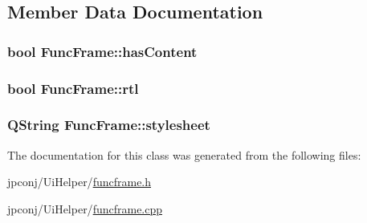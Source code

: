 \subsection{Member Data Documentation}
\subsubsection[{\texorpdfstring{has\+Content}{hasContent}}]{\setlength{\rightskip}{0pt plus 5cm}bool Func\+Frame\+::has\+Content\hspace{0.3cm}{\ttfamily [protected]}}\hypertarget{class_func_frame_a9e2ab69ca54b7f45ab9b314b5a2d94ff}{}\label{class_func_frame_a9e2ab69ca54b7f45ab9b314b5a2d94ff}
\subsubsection[{\texorpdfstring{rtl}{rtl}}]{\setlength{\rightskip}{0pt plus 5cm}bool Func\+Frame\+::rtl\hspace{0.3cm}{\ttfamily [protected]}}\hypertarget{class_func_frame_a9afcf2865055116446b9f50406bb1c12}{}\label{class_func_frame_a9afcf2865055116446b9f50406bb1c12}
\subsubsection[{\texorpdfstring{stylesheet}{stylesheet}}]{\setlength{\rightskip}{0pt plus 5cm}Q\+String Func\+Frame\+::stylesheet\hspace{0.3cm}{\ttfamily [protected]}}\hypertarget{class_func_frame_a62f747a890411dd79469f66dcb853f3c}{}\label{class_func_frame_a62f747a890411dd79469f66dcb853f3c}


The documentation for this class was generated from the following files\+:\begin{DoxyCompactItemize}
\item 
jpconj/\+Ui\+Helper/\hyperlink{funcframe_8h}{funcframe.\+h}\item 
jpconj/\+Ui\+Helper/\hyperlink{funcframe_8cpp}{funcframe.\+cpp}\end{DoxyCompactItemize}
